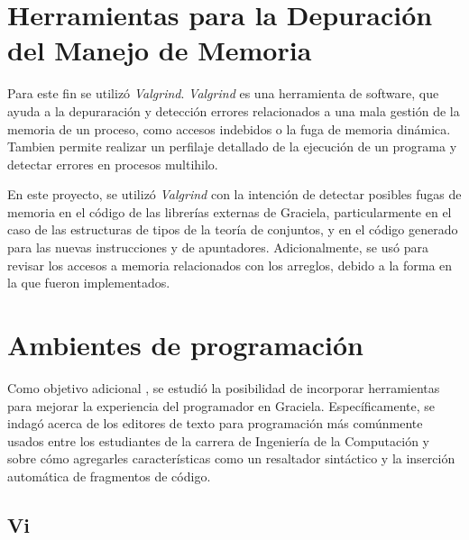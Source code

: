 \section{Herramientas para la Depuración del Manejo de Memoria}

Para este fin se utilizó \textit{Valgrind}. \textit{Valgrind} es una herramienta
de software, que ayuda a la depuraración y detección errores relacionados a una
mala gestión de la memoria de un proceso, como accesos indebidos o la fuga de
memoria dinámica. Tambien permite realizar un perfilaje detallado de la
ejecución de un programa y detectar errores en procesos multihilo.

En este proyecto, se utilizó \textit{Valgrind} con la intención de detectar
posibles fugas de memoria en el código de las librerías externas de Graciela,
particularmente en el caso de las estructuras de tipos de la teoría de
conjuntos, y en el código generado para las nuevas instrucciones  y
 de apuntadores. Adicionalmente, se usó para revisar los accesos a
memoria relacionados con los arreglos, debido a la forma en la que fueron
implementados.


\section{Ambientes de programación}

Como objetivo adicional , se estudió la posibilidad de
incorporar herramientas para mejorar la experiencia del programador en Graciela.
Específicamente, se indagó acerca de los editores de texto para programación más
comúnmente usados entre los estudiantes de la carrera de Ingeniería de la
Computación y sobre cómo agregarles características como un resaltador
sintáctico y la inserción automática de fragmentos de código.

\subsection{Vi}

